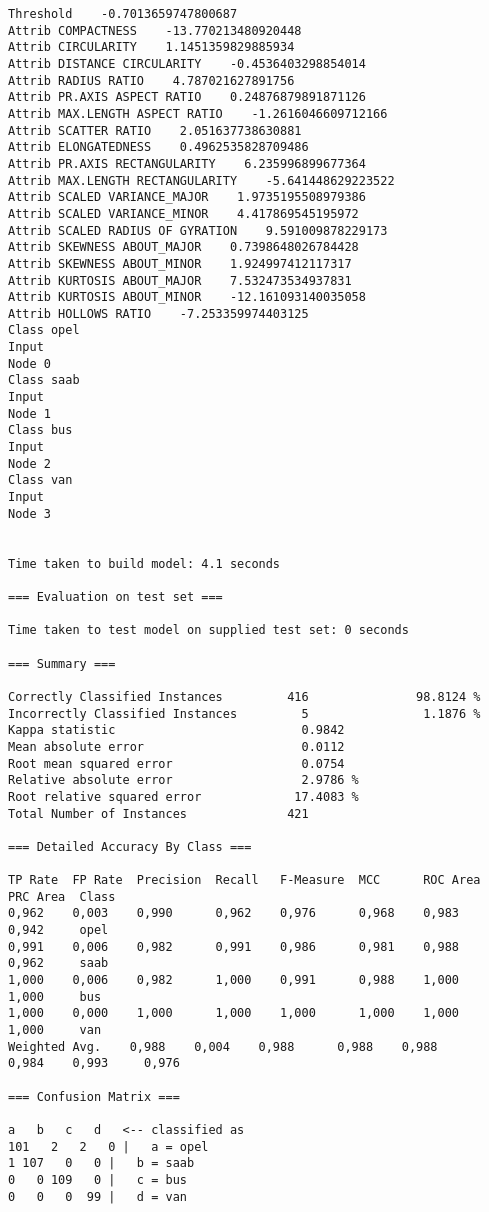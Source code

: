 \documentclass[
	article,			%
	11pt,				%
	oneside,			%
	a4paper,			%
	english,			%
	brazil,				%
	sumario=tradicional
	]{abntex2}
\begin{document}
\begin{lstlisting}
Threshold    -0.7013659747800687
Attrib COMPACTNESS    -13.770213480920448
Attrib CIRCULARITY    1.1451359829885934
Attrib DISTANCE CIRCULARITY    -0.4536403298854014
Attrib RADIUS RATIO    4.787021627891756
Attrib PR.AXIS ASPECT RATIO    0.24876879891871126
Attrib MAX.LENGTH ASPECT RATIO    -1.2616046609712166
Attrib SCATTER RATIO    2.051637738630881
Attrib ELONGATEDNESS    0.4962535828709486
Attrib PR.AXIS RECTANGULARITY    6.235996899677364
Attrib MAX.LENGTH RECTANGULARITY    -5.641448629223522
Attrib SCALED VARIANCE_MAJOR    1.9735195508979386
Attrib SCALED VARIANCE_MINOR    4.417869545195972
Attrib SCALED RADIUS OF GYRATION    9.591009878229173
Attrib SKEWNESS ABOUT_MAJOR    0.7398648026784428
Attrib SKEWNESS ABOUT_MINOR    1.924997412117317
Attrib KURTOSIS ABOUT_MAJOR    7.532473534937831
Attrib KURTOSIS ABOUT_MINOR    -12.161093140035058
Attrib HOLLOWS RATIO    -7.253359974403125
Class opel
Input
Node 0
Class saab
Input
Node 1
Class bus
Input
Node 2
Class van
Input
Node 3


Time taken to build model: 4.1 seconds

=== Evaluation on test set ===

Time taken to test model on supplied test set: 0 seconds

=== Summary ===

Correctly Classified Instances         416               98.8124 %
Incorrectly Classified Instances         5                1.1876 %
Kappa statistic                          0.9842
Mean absolute error                      0.0112
Root mean squared error                  0.0754
Relative absolute error                  2.9786 %
Root relative squared error             17.4083 %
Total Number of Instances              421     

=== Detailed Accuracy By Class ===

TP Rate  FP Rate  Precision  Recall   F-Measure  MCC      ROC Area  PRC Area  Class
0,962    0,003    0,990      0,962    0,976      0,968    0,983     0,942     opel
0,991    0,006    0,982      0,991    0,986      0,981    0,988     0,962     saab
1,000    0,006    0,982      1,000    0,991      0,988    1,000     1,000     bus
1,000    0,000    1,000      1,000    1,000      1,000    1,000     1,000     van
Weighted Avg.    0,988    0,004    0,988      0,988    0,988      0,984    0,993     0,976     

=== Confusion Matrix ===

a   b   c   d   <-- classified as
101   2   2   0 |   a = opel
1 107   0   0 |   b = saab
0   0 109   0 |   c = bus
0   0   0  99 |   d = van


\end{lstlisting}
\end{document}
